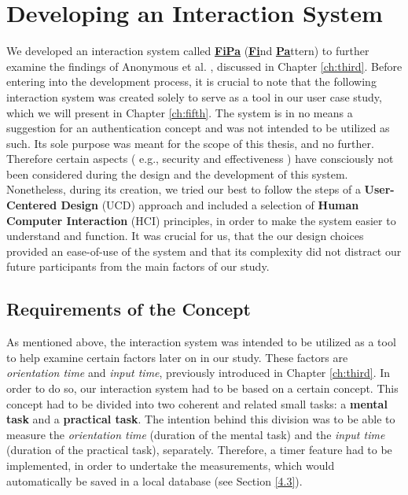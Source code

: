 
\chapter{Developing an Interaction System}\label{ch:forth}
We developed an interaction system called \underline{\textbf{FiPa}} (\underline{\textbf{Fi}}nd \underline{\textbf{Pa}}ttern) to further examine the findings of Anonymous et al. \cite{anonymous}, discussed in Chapter \ref{ch:third}. Before entering into the development process, it is crucial to note that the following interaction system was created solely to serve as a tool in our user case study, which we will present in Chapter \ref{ch:fifth}. The system is in no means a suggestion for an authentication concept and was not intended to be utilized as such. Its sole purpose was meant for the scope of this thesis, and no further. Therefore certain aspects ( e.g., security and effectiveness ) have consciously not been considered during the design and the development of this system. Nonetheless, during its creation, we tried our best to follow the steps of a \textbf{User-Centered Design} (UCD) approach and included a selection of \textbf{Human Computer Interaction} (HCI) principles, in order to make the system easier to understand and function. It was crucial for us, that the our design choices provided an ease-of-use of the system and that its complexity did not distract our future participants from the main factors of our study.


\section{Requirements of the Concept} \label{4.1}
As mentioned above, the interaction system was intended to be utilized as a tool to help examine certain factors later on in our study. These factors are \textit{orientation time} and \textit{input time}, previously introduced in Chapter \ref{ch:third}. In order to do so, our interaction system had to be based on a certain concept. This concept had to be divided into two coherent and related small tasks: a \textbf{mental task} and a \textbf{practical task}. The intention behind this division was to be able to measure the \textit{orientation time} (duration of the mental task) and the \textit{input time} (duration of the practical task), separately. Therefore, a timer feature had to be implemented, in order to undertake the measurements, which would automatically be saved in a local database (see Section \ref{4.3}).\\


